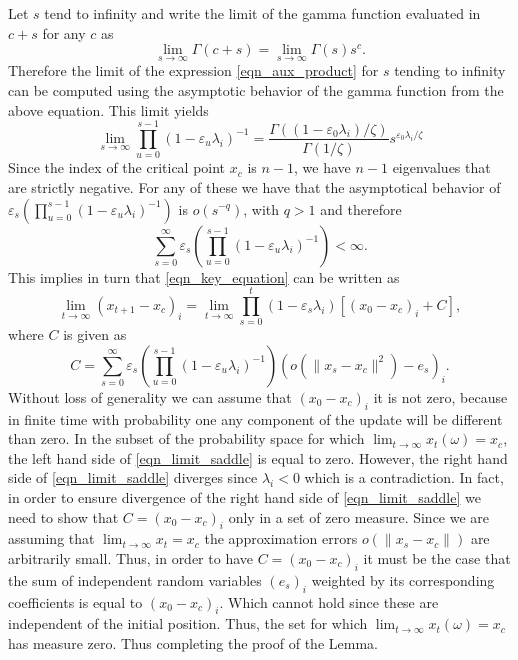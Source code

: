\documentclass[article]{IEEEtran}
\theoremstyle{definition}
\begin{document}
%
Let $s$ tend to infinity and write the limit of the gamma function evaluated in $c+s$ for any $c$ as
%
\begin{equation}
\lim_{s\to \infty} \Gamma(c+s) = \lim_{s\to\infty} \Gamma(s)s^c. 
\end{equation}
%
Therefore the limit of the expression \eqref{eqn_aux_product} for $s$ tending to infinity can be computed using the asymptotic behavior of the gamma function from the above equation. This limit yields
%
\begin{equation}
\lim_{s\to\infty}\prod_{u=0}^{s-1} (1 -\varepsilon_u  \lambda_i)^{-1} =\frac{\Gamma((1-\varepsilon_0\lambda_i)/\zeta)}{\Gamma(1/\zeta)}s^{\varepsilon_0\lambda_i/\zeta}
\end{equation}
%
Since the index of the critical point $x_c$ is $n-1$, we have $n-1$ eigenvalues that are strictly negative. For any of these we have that the asymptotical behavior of $\varepsilon_s\left(\prod_{u=0}^{s-1} (1 -\varepsilon_u  \lambda_i)^{-1}\right) $ is $o(s^{-q})$, with $q>1$ and therefore
%
\begin{equation}
\sum_{s=0}^\infty\varepsilon_s\left(\prod_{u=0}^{s-1} (1 -\varepsilon_u  \lambda_i)^{-1}\right) < \infty.
\end{equation}
%
This implies in turn that \eqref{eqn_key_equation} can be written as 
%
\begin{equation}\label{eqn_limit_saddle}
\lim_{t\to \infty} (x_{t+1} - x_c)_{i} = \lim_{t\to\infty} \prod_{s=0}^t (1-\varepsilon_s\lambda_i) \left[(x_0-x_c)_{i} +C\right],
\end{equation}
where $C$ is given as
%
\begin{equation}
C=\sum_{s=0}^\infty\varepsilon_s\left(\prod_{u=0}^{s-1} (1 -\varepsilon_u  \lambda_i)^{-1}\right)\left( o(\|x_s-x_{c}\|^2) -e_s\right)_{i}.
\end{equation}
%
Without loss of generality we can assume that $(x_0-x_c)_{i}$ it is not zero, because in finite time with probability one any component of the update will be different than zero. In the subset of the probability space for which $\lim_{t\to \infty} x_t(\omega) = x_c$, the left hand side of \eqref{eqn_limit_saddle} is equal to zero. However, the right hand side of \eqref{eqn_limit_saddle} diverges since $\lambda_i<0$ which is a contradiction. In fact, in order to ensure divergence of the right hand side of \eqref{eqn_limit_saddle} we need to show that $C = (x_0 -x_c)_i$ only in a set of zero measure. Since we are assuming that $\lim_{t\to\infty} x_t =x_c$ the approximation errors $o(\| x_s- x_c\|)$ are arbitrarily small. Thus, in order to have $C = (x_0-x_c)_i$ it must be the case that the sum of independent random variables $(e_s)_i$ weighted by its corresponding coefficients is equal to $(x_0-x_c)_i$. Which cannot hold since these are independent of the initial position. Thus, the set for which $\lim_{t\to \infty} x_t(\omega) = x_c$ has measure zero. Thus completing the proof of the Lemma.
\end{document}
